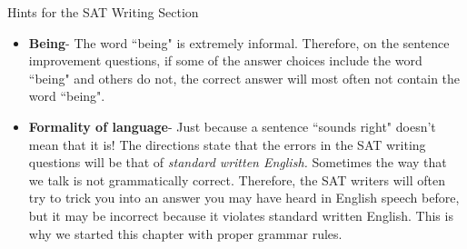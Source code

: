 \documentclass[12pt]{book}
\begin{document}
\bigskip
Hints for the SAT Writing Section
\begin{itemize}
\item \textbf{Being}- The word ``being" is extremely informal. Therefore, on the sentence improvement questions, if some of the answer choices include the word ``being" and others do not, the correct answer will most often not contain the word ``being". 
\item \textbf{Formality of language}- Just because a sentence ``sounds right" doesn't mean that it is! The directions state that the errors in the SAT writing questions will be that of \textit{ standard written English.} Sometimes the way that we talk is not grammatically correct. Therefore, the SAT writers will often try to trick you into an answer you may have heard in English speech before, but it may be incorrect because it violates standard written English. This is why we started this chapter with proper grammar rules. 
\end{itemize}

\newpage
\end{document}
